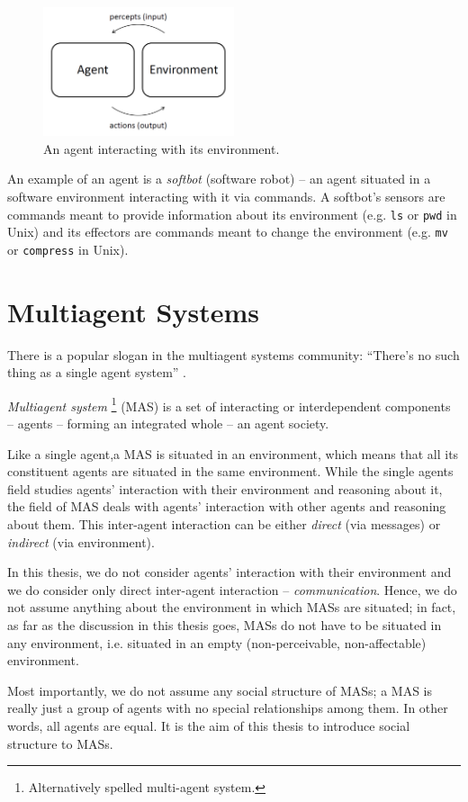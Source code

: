 \begin{figure}[h]
	\centering
	\includegraphics[width=0.5\textwidth]{images/agent-environment-interaction.png}
	\caption{An agent interacting with its environment.}
	\label{figure:agent-environment-interaction}
\end{figure}

An example of an agent is a \textit{softbot} (software robot) -- an agent situated in a software environment interacting with it via commands. A softbot's sensors are commands meant to provide information about its environment (e.g. \texttt{ls} or \texttt{pwd} in Unix) and its effectors are commands meant to change the environment (e.g. \texttt{mv} or \texttt{compress} in Unix).

\section{Multiagent Systems}

There is a popular slogan in the multiagent systems community: ``There's no such thing as a single agent system'' \cite{Wooldridge09}.

\textit{Multiagent system}
\footnote{Alternatively spelled multi-agent system.}
(MAS) is a set of interacting or interdependent components -- agents -- forming an integrated whole -- an agent society.

Like a single agent,a MAS is situated in an environment, which means that all its constituent agents are situated in the same environment.
While the single agents field studies agents' interaction with their environment and reasoning about it, the field of MAS deals with agents' interaction with other agents and reasoning about them.
This inter-agent interaction can be either \textit{direct} (via messages) or \textit{indirect} (via environment).

In this thesis, we do not consider agents' interaction with their environment and we do consider only direct inter-agent interaction -- \textit{communication}.
Hence, we do not assume anything about the environment in which MASs are situated; in fact, as far as the discussion in this thesis goes, MASs do not have to be situated in any environment, i.e. situated in an empty (non-perceivable, non-affectable) environment.

Most importantly, we do not assume any social structure of MASs; a MAS is really just a group of agents with no special relationships among them.
In other words, all agents are equal.
It is the aim of this thesis to introduce social structure to MASs.